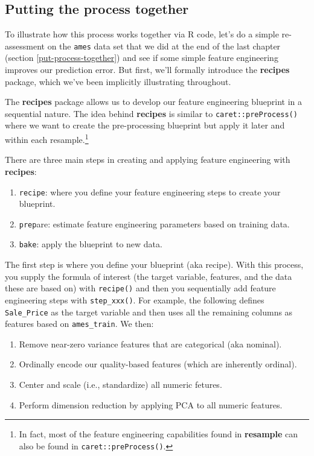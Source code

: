 \documentclass[]{krantz}
\providecommand{\tightlist}{%
  \setlength{\itemsep}{0pt}\setlength{\parskip}{0pt}}
\begin{document}
\hypertarget{engineering-process-example}{%
\subsection{Putting the process together}\label{engineering-process-example}}

To illustrate how this process works together via R code, let's do a simple re-assessment on the \texttt{ames} data set that we did at the end of the last chapter (section \ref{put-process-together}) and see if some simple feature engineering improves our prediction error. But first, we'll formally introduce the \textbf{recipes} package, which we've been implicitly illustrating throughout.

The \textbf{recipes} package allows us to develop our feature engineering blueprint in a sequential nature. The idea behind \textbf{recipes} is similar to \texttt{caret::preProcess()} where we want to create the pre-processing blueprint but apply it later and within each resample.\footnote{In fact, most of the feature engineering capabilities found in \textbf{resample} can also be found in \texttt{caret::preProcess()}.}

There are three main steps in creating and applying feature engineering with \textbf{recipes}:

\begin{enumerate}
\def\labelenumi{\arabic{enumi}.}
\tightlist
\item
  \texttt{recipe}: where you define your feature engineering steps to create your blueprint.
\item
  \texttt{prep}are: estimate feature engineering parameters based on training data.
\item
  \texttt{bake}: apply the blueprint to new data.
\end{enumerate}

The first step is where you define your blueprint (aka recipe). With this process, you supply the formula of interest (the target variable, features, and the data these are based on) with \texttt{recipe()} and then you sequentially add feature engineering steps with \texttt{step\_xxx()}. For example, the following defines \texttt{Sale\_Price} as the target variable and then uses all the remaining columns as features based on \texttt{ames\_train}. We then:

\begin{enumerate}
\def\labelenumi{\arabic{enumi}.}
\tightlist
\item
  Remove near-zero variance features that are categorical (aka nominal).
\item
  Ordinally encode our quality-based features (which are inherently ordinal).
\item
  Center and scale (i.e., standardize) all numeric fetures.
\item
  Perform dimension reduction by applying PCA to all numeric features.
\end{enumerate}
\end{document}
